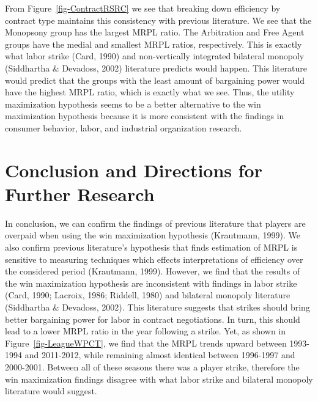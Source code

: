 \documentclass[
  12pt,
  letterpaper,
  DIV=11,
  numbers=noendperiod]{scrartcl}
\begin{document}
From Figure~\ref{fig-ContractRSRC} we see that breaking down efficiency
by contract type maintains this consistency with previous literature. We
see that the Monopsony group has the largest MRPL ratio. The Arbitration
and Free Agent groups have the medial and smallest MRPL ratios,
respectively. This is exactly what labor strike (Card, 1990) and
non-vertically integrated bilateral monopoly (Siddhartha \& Devadoss,
2002) literature predicts would happen. This literature would predict
that the groups with the least amount of bargaining power would have the
highest MRPL ratio, which is exactly what we see. Thus, the utility
maximization hypothesis seems to be a better alternative to the win
maximization hypothesis because it is more consistent with the findings
in consumer behavior, labor, and industrial organization research.

\hypertarget{conclusion-and-directions-for-further-research}{%
\section{Conclusion and Directions for Further
Research}\label{conclusion-and-directions-for-further-research}}

In conclusion, we can confirm the findings of previous literature that
players are overpaid when using the win maximization hypothesis
(Krautmann, 1999). We also confirm previous literature's hypothesis that
finds estimation of MRPL is sensitive to measuring techniques which
effects interpretations of efficiency over the considered period
(Krautmann, 1999). However, we find that the results of the win
maximization hypothesis are inconsistent with findings in labor strike
(Card, 1990; Lacroix, 1986; Riddell, 1980) and bilateral monopoly
literature (Siddhartha \& Devadoss, 2002). This literature suggests that
strikes should bring better bargaining power for labor in contract
negotiations. In turn, this should lead to a lower MRPL ratio in the
year following a strike. Yet, as shown in Figure~\ref{fig-LeagueWPCT},
we find that the MRPL trends upward between 1993-1994 and 2011-2012,
while remaining almost identical between 1996-1997 and 2000-2001.
Between all of these seasons there was a player strike, therefore the
win maximization findings disagree with what labor strike and bilateral
monopoly literature would suggest.
\end{document}
